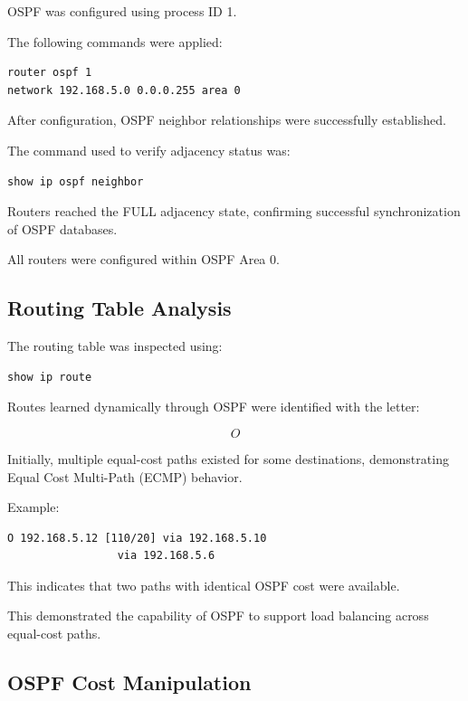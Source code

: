 \documentclass[12pt]{article}
\begin{document}
OSPF was configured using process ID 1.

The following commands were applied:

\begin{lstlisting}
router ospf 1
network 192.168.5.0 0.0.0.255 area 0
\end{lstlisting}

After configuration, OSPF neighbor relationships were successfully established.

The command used to verify adjacency status was:

\begin{lstlisting}
show ip ospf neighbor
\end{lstlisting}

Routers reached the FULL adjacency state, confirming successful synchronization of OSPF databases.

All routers were configured within OSPF Area 0.

\subsection{Routing Table Analysis}

The routing table was inspected using:

\begin{lstlisting}
show ip route
\end{lstlisting}

Routes learned dynamically through OSPF were identified with the letter:

\[
O
\]

Initially, multiple equal-cost paths existed for some destinations, demonstrating Equal Cost Multi-Path (ECMP) behavior.

Example:

\begin{lstlisting}
O 192.168.5.12 [110/20] via 192.168.5.10
                 via 192.168.5.6
\end{lstlisting}

This indicates that two paths with identical OSPF cost were available.

This demonstrated the capability of OSPF to support load balancing across equal-cost paths.

\subsection{OSPF Cost Manipulation}
\end{document}
